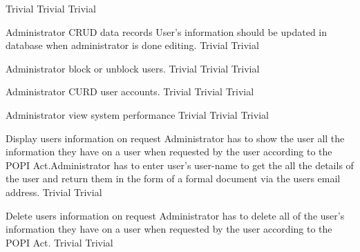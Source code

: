   	{Trivial}
	 	{Trivial}
  	{Trivial}
 
\FuncReq
    {Administrator CRUD data records}
		{User's information should be updated in database when administrator is done editing.}
		{Trivial}
 		{Trivial}

\FuncReq
    {Administrator block or unblock users.}   
    {Trivial}
    {Trivial}
    {Trivial}
				
\FuncReq
    {Administrator CURD user accounts.}
    {Trivial}
    {Trivial}
 	 	{Trivial}

\FuncReq
    {Administrator view system performance}
    {Trivial}
    {Trivial}
    {Trivial}

\FuncReq
    {Display users information on request}
    {Administrator has to show the user all the information they have on a user when requested by the user according to the POPI 		Act.Administrator has to enter user's user-name to get the all the details of the user and return them in the form of a formal 		document via the users email address.
    }
	{Trivial}
	{Trivial}

\FuncReq
  {Delete users information on request}
	{Administrator has to delete all of the user's information they have on a user when requested by the user according to the POPI Act.}
	{Trivial}
	{Trivial}

